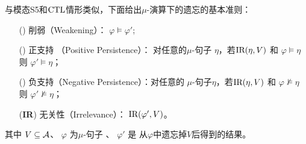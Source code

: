 与模态S5和$\textrm{CTL}$情形类似，下面给出$\mu$-演算下的遗忘的基本准则：
\begin{itemize}
	\item[(\W)]  削弱（Weakening）： $\varphi \models \varphi'$;
	\item[(\PP)]  正支持 （Positive Persistence）：
	对任意的$\mu$-句子 $\eta$，若$\textrm{IR}(\eta, V)$ 和 $\varphi \models \eta$ 则 $\varphi' \models \eta$；
	\item[(\NgP)]  负支持（Negative Persistence）：对任意的 $\mu$-句子$\eta$，若$\textrm{IR}(\eta, V)$ 和 $\varphi \not \models \eta$ 则 $\varphi' \not \models \eta$；
	\item[(\textbf{IR})]  无关性（Irrelevance）： $\textrm{IR}(\varphi', V)$。
\end{itemize}
其中 $V\subseteq\cal A$、
$\varphi$ 为$\mu$-句子 、 $\varphi'$ 是 从$\varphi$中遗忘掉$V$后得到的结果。


